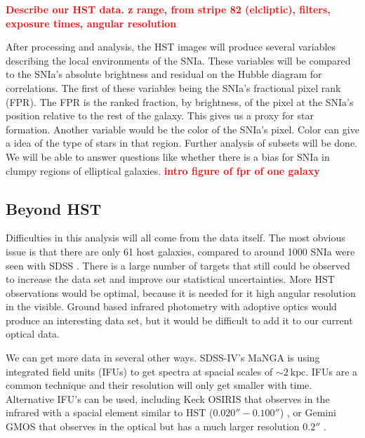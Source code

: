 \documentclass[apj, iop]{emulateapj}
\newcommand{\sn}{SNIa}
\newcommand{\todo}[1]{\textbf{\textcolor{red}{#1}}}
\begin{document}
\todo{Describe our HST data. z range, from stripe 82 (elcliptic), filters,
exposure times, angular resolution}

After processing and analysis, the HST images will produce several variables
describing the local environments of the \sn{}. These variables will be compared
to the \sn{}'s absolute brightness and residual on the Hubble diagram for
correlations. The first of these variables being the \sn{}'s fractional pixel
rank (FPR). The FPR is the ranked fraction, by brightness, of the pixel at the
\sn{}'s position relative to the rest of the galaxy. This gives us a proxy for
star formation. Another variable would be the color of the \sn{}'s pixel. Color
can give a idea of the type of stars in that region. Further analysis of subsets
will be done. We will be able to answer questions like whether there is a bias
for \sn{} in clumpy regions of elliptical galaxies.
\todo{intro figure of fpr of one galaxy}


\subsection{Beyond HST}\label{beyond-hst}

Difficulties in this analysis will all come from the data itself. The most
obvious issue is that there are only 61 host galaxies, compared to around 1000
\sn{} were seen with SDSS \citep{Campbell13}. There is a large number of targets
that still could be observed to increase the data set and improve our
statistical uncertainties. More HST observations would be optimal, because it is
needed for it high angular resolution in the visible. Ground based infrared
photometry with adoptive optics would produce an interesting data set, but it
would be difficult to add it to our current optical data.

We can get more data in several other ways. SDSS-IV's MaNGA is using integrated
field units (IFUs) to get spectra at spacial scales of $\sim 2 ~\text{kpc}$.
IFUs are a common technique and their resolution will only get smaller with
time. Alternative IFU's can be used, including Keck OSIRIS that observes in the
infrared with a spacial element similar to HST ($0.020'' - 0.100''$)
\citep{OSIRIS},
or Gemini GMOS that observes in the optical but has a much larger resolution
$0.2''$ \citep{Gemini}.
\end{document}
